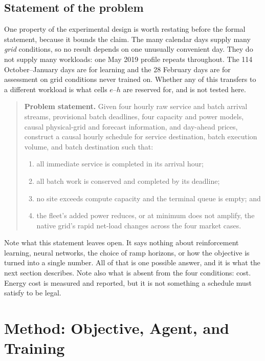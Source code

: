 ﻿\documentclass[12pt]{article}
\begin{document}
\subsection{Statement of the problem}
\label{subsec:problem-formal-statement}

One property of the experimental design is worth restating before the formal
statement, because it bounds the claim. The many calendar days supply many
\emph{grid} conditions, so no result depends on one unusually convenient day.
They do not supply many workloads: one May 2019 profile repeats throughout. The
114 October--January days are for learning and the 28 February days are for
assessment on grid conditions never trained on. Whether any of this transfers to
a different workload is what cells \(e\)--\(h\) are reserved for, and is not
tested here.

\begin{quote}
\textbf{Problem statement.}
Given four hourly raw service and batch arrival streams, provisional batch
deadlines, four capacity and power models, causal physical-grid and forecast
information, and day-ahead prices, construct a causal hourly schedule for
service destination, batch execution volume, and batch destination such that:
\begin{enumerate}
  \item all immediate service is completed in its arrival hour;
  \item all batch work is conserved and completed by its deadline;
  \item no site exceeds compute capacity and the terminal queue is empty; and
  \item the fleet's added power reduces, or at minimum does not amplify, the
        native grid's rapid net-load changes across the four market cases.
\end{enumerate}
\end{quote}

Note what this statement leaves open. It says nothing about reinforcement
learning, neural networks, the choice of ramp horizons, or how the objective is
turned into a single number. All of that is one possible answer, and it is what
the next section describes. Note also what is absent from the four conditions:
cost. Energy cost is measured and reported, but it is not something a schedule
must satisfy to be legal.

\section{Method: Objective, Agent, and Training}
\label{sec:optimization-objective}
\end{document}
